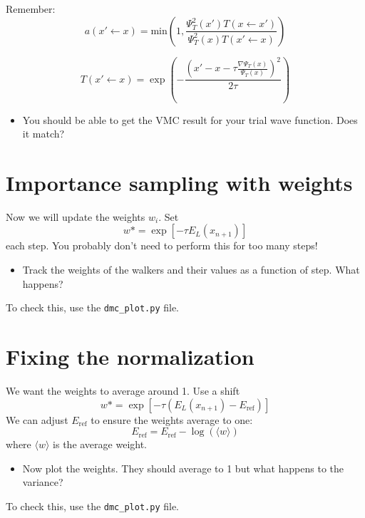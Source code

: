 \documentclass[12pt]{article}
\begin{document}
Remember:
\begin{equation}
	a(x' \leftarrow x) = \text{min}\left(1,\frac{\Psi_T^2(x') T(x \leftarrow x')}{\Psi_T^2(x) T(x' \leftarrow x)} \right)
\end{equation}

\begin{equation}
	T(x'\leftarrow x) = \exp\left(-\frac{ \left(x' - x - \tau \frac{\nabla \Psi_T(x)}{\Psi_T(x)}\right)^2}{ 2\tau}\right)
\end{equation}

\begin{itemize}
\item You should be able to get the VMC result for your trial wave function. Does it match? 
\end{itemize}

\section*{Importance sampling with weights}
Now we will update the weights $w_i$. Set 
\begin{equation}
w*=	\exp[-\tau E_L(x_{n+1})] 
\end{equation}
each step.
You probably don't need to perform this for too many steps!

\begin{itemize}
\item Track the weights of the walkers and their values as a function of step. What happens?
\end{itemize}
To check this, use the \texttt{dmc\_plot.py} file.


\section*{Fixing the normalization}

We want the weights to average around 1.
Use a shift 
\begin{equation}
w*=	\exp[-\tau (E_L(x_{n+1})-E_{\text{ref}})] 
\end{equation}
We can adjust $E_{\text {ref}}$ to ensure the weights average to one:
\begin{equation}
E_{\text{ref}}=E_{\text{ref}}-\log(\langle w \rangle) 
\end{equation}
where $\langle w \rangle$ is the average weight. 

\begin{itemize}
\item Now plot the weights. They should average to 1 but what happens to the variance?
\end{itemize}
To check this, use the \texttt{dmc\_plot.py} file.
\end{document}

